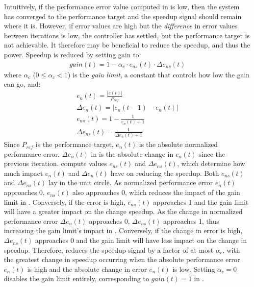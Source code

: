 Intuitively, if the performance error value computed in  is low, then the system has converged to the performance target and the speedup signal should remain where it is.
However, if error values are high but the \emph{difference} in error values between iterations is low, the controller has settled, but the performance target is not achievable.
It therefore may be beneficial to reduce the speedup, and thus the power.
Speedup is reduced by setting gain to:
\begin{eqnarray}
  gain(t) = 1 - \alpha_c \cdot e_{ns}(t) \cdot \Delta e_{ns}(t)
  \label{eqn:cost-pole}
\end{eqnarray}
where $\alpha_c$ ($0 \le \alpha_c < 1$) is the \emph{gain limit}, a constant that controls how low the gain can go, and:
\begin{eqnarray}
  e_n(t) = \frac{|e(t)|}{P_{ref}}
  \label{eqn:en} \\
  \Delta e_n(t) = \left| e_n(t-1) - e_n(t) \right|
  \label{eqn:den} \\
  e_{ns}(t) = 1 - \frac{1}{e_{n}(t)+1}
  \label{eqn:ens} \\
  \Delta e_{ns}(t) = \frac{1}{\Delta e_{n}(t)+1}
  \label{eqn:dens}
\end{eqnarray}
Since $P_{ref}$ is the performance target, $e_n(t)$ is the absolute normalized performance error.
$\Delta e_n(t)$ in  is the absolute change in $e_n(t)$ since the previous iteration.
 compute values $e_{ns}(t)$ and $\Delta e_{ns}(t)$, which determine how much impact $e_n(t)$ and $\Delta e_{n}(t)$ have on reducing the speedup.
Both $e_{ns}(t)$ and $\Delta e_{ns}(t)$ lay in the unit circle.
As normalized performance error $e_n(t)$ approaches 0, $e_{ns}(t)$ also approaches 0, which reduces the impact of the gain limit in .
Conversely, if the error is high, $e_{ns}(t)$ approaches 1 and the gain limit will have a greater impact on the change speedup.
As the change in normalized performance error $\Delta e_{n}(t)$ approaches 0, $\Delta e_{ns}(t)$ approaches 1, thus increasing the gain limit's impact in .
Conversely, if the change in error is high, $\Delta e_{ns}(t)$ approaches 0 and the gain limit will have less impact on the change in speedup.
Therefore,  reduces the speedup signal by a factor of at most $\alpha_c$, with the greatest change in speedup occurring when the absolute performance error $e_n(t)$ is high and the absolute change in error $e_n(t)$ is low.
Setting $\alpha_c=0$ disables the gain limit entirely, corresponding to $gain(t) =1 $ in .

